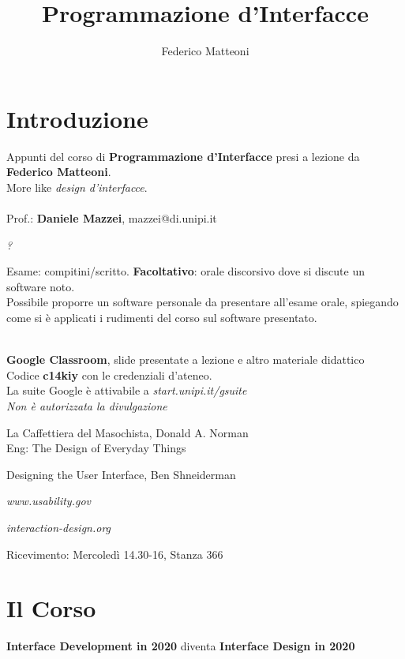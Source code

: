 \documentclass[10pt]{article}
\begin{document}
\title{Programmazione d'Interfacce}
\author{Federico Matteoni}
\date{ }
\renewcommand*\contentsname{Indice}

\maketitle
\tableofcontents
\pagebreak
\section{Introduzione}
Appunti del corso di \textbf{Programmazione d'Interfacce} presi a lezione da \textbf{Federico Matteoni}.\\More like \textit{design d'interfacce}.\\\\
Prof.: \textbf{Daniele Mazzei}, mazzei@di.unipi.it\\
\begin{list}{-}{Riferimenti web:}
\item \emph{?}
\end{list}
Esame: compitini/scritto. \textbf{Facoltativo}: orale discorsivo dove si discute un software noto.\\Possibile proporre un software personale da presentare all'esame orale, spiegando come si è applicati i rudimenti del corso sul software presentato.\\\\
\begin{list}{-}{Materiale didattico:}
\item \textbf{Google Classroom}, slide presentate a lezione e altro materiale didattico\\Codice \textbf{c14kiy} con le credenziali d'ateneo.\\La suite Google è attivabile a \emph{start.unipi.it/gsuite}\\\textit{Non è autorizzata la divulgazione}
\item La Caffettiera del Masochista, Donald A. Norman\\Eng: The Design of Everyday Things
\item Designing the User Interface, Ben Shneiderman
\item \emph{www.usability.gov}
\item \emph{interaction-design.org}
\end{list}
Ricevimento: Mercoledì 14.30-16, Stanza 366\\

\section{Il Corso}
\textbf{Interface Development in 2020} diventa \textbf{Interface Design in 2020}
\end{document}
